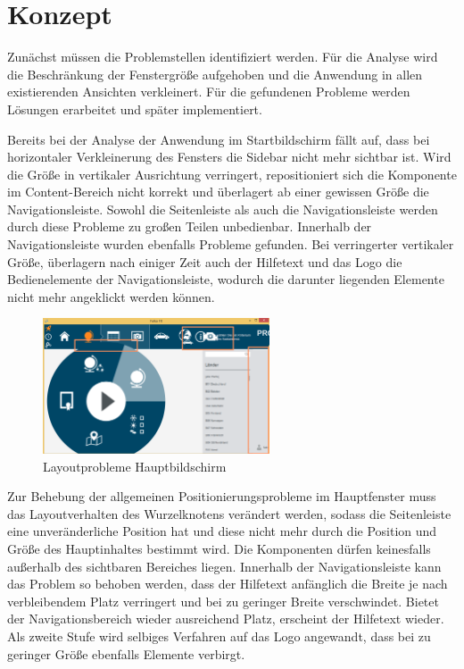 \section{Konzept} \label{sec:responsiveConcept}
Zunächst müssen die Problemstellen identifiziert werden. Für die Analyse wird die Beschränkung der Fenstergröße aufgehoben und die Anwendung in allen existierenden Ansichten verkleinert. Für die gefundenen Probleme werden Lösungen erarbeitet und später implementiert.\par
{}
Bereits bei der Analyse der Anwendung im Startbildschirm fällt auf, dass bei horizontaler Verkleinerung des Fensters die Sidebar nicht mehr sichtbar ist. Wird die Größe in vertikaler Ausrichtung verringert, repositioniert sich die Komponente im Content-Bereich nicht korrekt und überlagert ab einer gewissen Größe die Navigationsleiste. Sowohl die Seitenleiste als auch die Navigationsleiste werden durch diese Probleme zu großen Teilen unbedienbar. Innerhalb der Navigationsleiste wurden ebenfalls Probleme gefunden. Bei verringerter vertikaler Größe, überlagern nach einiger Zeit auch der Hilfetext und das Logo die Bedienelemente der Navigationsleiste, wodurch die darunter liegenden Elemente nicht mehr angeklickt werden können.\par
\begin{figure}[H]
 \centering
 \includegraphics[width=0.6\textwidth]{grafiken/radial_bug.png}
 \caption{Layoutprobleme Hauptbildschirm}
 \label{fig:layoutMainScreen}
\end{figure}
Zur Behebung der allgemeinen Positionierungsprobleme im Hauptfenster muss das Layoutverhalten des Wurzelknotens verändert werden, sodass die Seitenleiste eine unveränderliche Position hat und diese nicht mehr durch die Position und Größe des Hauptinhaltes bestimmt wird. Die Komponenten dürfen keinesfalls außerhalb des sichtbaren Bereiches liegen. Innerhalb der Navigationsleiste kann das Problem so behoben werden, dass der Hilfetext anfänglich die Breite je nach verbleibendem Platz verringert und bei zu geringer Breite verschwindet. Bietet der Navigationsbereich wieder ausreichend Platz, erscheint der Hilfetext wieder. Als zweite Stufe wird selbiges Verfahren auf das Logo angewandt, dass bei zu geringer Größe ebenfalls Elemente verbirgt.\par
